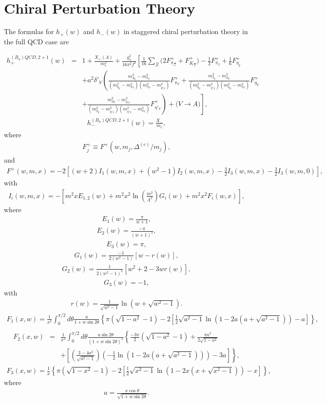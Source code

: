 \documentclass[11pt]{article}
\def\bea{\begin{eqnarray}}
\def\eea{\end{eqnarray}}
\begin{document}
\section{Chiral Perturbation Theory}

The formulas for $h_+(w)$ and $h_-(w)$ in staggered chiral perturbation theory in the full QCD case are

\begin{eqnarray}\label{eq:h+full} h_{+}^{(B_u)QCD,2+1}(w)&=&
1+\frac{X_{+}(\Lambda)}{m_c^2}+\frac{g^2_\pi}{16\pi^2f^2}\left[\frac{1}{16}\sum_{\Xi}\big(2F^+_{\pi_\Xi}+F^+_{K_\Xi}\big)
-\frac{1}{2}F^+_{\pi_I}+\frac{1}{6}F^+_{\eta_I} \right.\nonumber
\\ &&
+a^2\delta'_V\left(\frac{m^2_{S_V}-m^2_{\pi_V}}{(m^2_{\eta_V}-m^2_{\pi_V})(m^2_{\pi_V}-m^2_{\eta'_V})}F^+_{\pi_V}
+\frac{m^2_{\eta_V}-m^2_{S_V}}{(m^2_{\eta_V}-m^2_{\eta'_V})(m^2_{\eta_V}-m^2_{\pi_V})}F^+_{\eta_V}
\right. \nonumber \\ && \left. \left.
+\frac{m^2_{S_V}-m^2_{\eta'_V}}{(m^2_{\eta_V}-m^2_{\eta'_V})(m^2_{\eta'_V}-m^2_{\pi_V})}F^+_{\eta'_V}\right)
+\big(V\rightarrow A\big) \right], \end{eqnarray}
%
\bea h_-^{(B_u)QCD, 2+1}(w) = \frac{X_-}{m_c},
\eea
where
%
\bea  F^+_j \equiv F^+(w, m_j, \Delta^{(c)}/m_j),
\eea
%
and
%
\bea   F^+(w, m, x) = -2\left[(w+2)I_1(w, m, x)+(w^2-1)I_2(w, m, x)-\frac{3}{2}I_3(w, m, x) -\frac{3}{2}I_3(w, m, 0)\right],
\eea
%
with
%
\bea  I_{i}(w, m, x)= -\left[m^2 x E_{1,2}(w) + m^2 x^2 \ln \left(\frac{m^2}{\Lambda^2} \right)G_{i}(w) +m^2x^2F_{i}(w, x)\right],
\eea
%
where
%
\bea  E_1(w) = \frac{\pi}{w+1},
\eea
\bea  E_2(w) = \frac{-\pi}{(w+1)^2},
\eea
\bea  E_3(w) = \pi,
\eea
\bea  G_1(w) = \frac{-1}{2(w^2-1)}[w-r(w)],
\eea
\bea  G_2(w) = \frac{1}{2(w^2-1)^2}[w^2+2-3wr(w)],
\eea
\bea  G_3(w) = -1,
\eea
%
with
%
\bea  r(w) = \frac{1}{\sqrt{w^2-1}}\ln (w+\sqrt{w^2-1}).
\eea
%
\bea  F_1(x, w)= \frac{1}{x^2}\int_0^{\pi/2} d\theta \frac{a}{1+w \sin 2\theta} \left\{ \pi\left(\sqrt{1-a^2} -1\right)-2\left[\frac{1}{2}\sqrt{a^2-1}\ln \left(1-2a(a+\sqrt{a^2-1}) \right) -a \right] \right\}, \nonumber \\
\eea
%
\bea  F_2(x, w) &=& \frac{1}{x^2}\int_0^{\pi/2} d\theta \frac{a \sin 2\theta}{(1+w \sin 2\theta)^2}\left\{ \frac{-3\pi}{2}\left(\sqrt{1-a^2} -1\right) +\frac{\pi a^2}{2\sqrt{1-a^2}} \right. \nonumber \\ && \left. +\left[\left(\frac{3-4a^2}{\sqrt{a^2-1}} \right)\left(-\frac{1}{2}\ln (1-2a(a+\sqrt{a^2-1}))\right) -3a \right] \right\},
\eea
%
\bea  F_3(x, w) = \frac{1}{x}\left\{\pi\left(\sqrt{1-x^2}-1\right)-2\left[\frac{1}{2}\sqrt{x^2-1}\ln (1-2x(x+\sqrt{x^2-1}))-x \right] \right\},
\eea
%
where
%
\bea a=\frac{x \cos \theta}{\sqrt{1+w \sin 2\theta}}.
\eea
\end{document}
